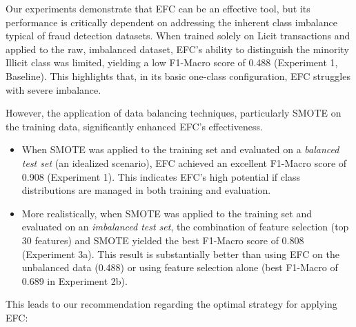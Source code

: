 \documentclass[12pt]{article}
\begin{document}
Our experiments demonstrate that EFC can be an effective tool, but its performance is critically dependent on addressing
the inherent class imbalance typical of fraud detection datasets. When trained solely on Licit transactions and applied to
the raw, imbalanced dataset, EFC's ability to distinguish the minority Illicit class was limited, yielding a low F1-Macro
score of 0.488 (Experiment 1, Baseline). This highlights that, in its basic one-class configuration, EFC struggles with severe imbalance.

However, the application of data balancing techniques, particularly SMOTE on the training data, significantly enhanced EFC's effectiveness.
\begin{itemize}
    \item When SMOTE was applied to the training set and evaluated on a \textit{balanced test set} (an idealized scenario),
    EFC achieved an excellent F1-Macro score of 0.908 (Experiment 1). This indicates EFC's high potential if class distributions 
    are managed in both training and evaluation.
    \item More realistically, when SMOTE was applied to the training set and evaluated on an \textit{imbalanced test set},
    the combination of feature selection (top 30 features) and SMOTE yielded the best F1-Macro score of 0.808 (Experiment 3a).
    This result is substantially better than using EFC on the unbalanced data (0.488) or using feature selection alone
    (best F1-Macro of 0.689 in Experiment 2b).
\end{itemize}

This leads to our recommendation regarding the optimal strategy for applying EFC:

\vspace{\medskipamount} %
\end{document}
